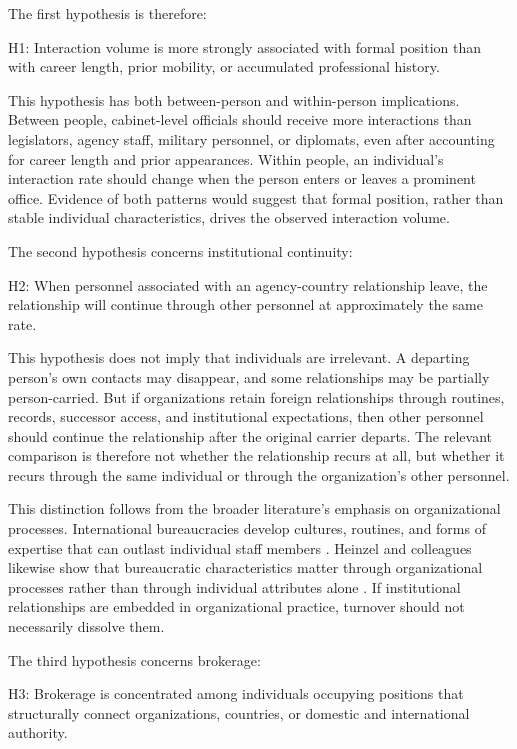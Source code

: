 \documentclass[11pt]{article}
\begin{document}
The first hypothesis is therefore:

H1: Interaction volume is more strongly associated with formal position than with career length, prior mobility, or accumulated professional history.

This hypothesis has both between-person and within-person implications. Between people, cabinet-level officials should receive more interactions than legislators, agency staff, military personnel, or diplomats, even after accounting for career length and prior appearances. Within people, an individual’s interaction rate should change when the person enters or leaves a prominent office. Evidence of both patterns would suggest that formal position, rather than stable individual characteristics, drives the observed interaction volume.

The second hypothesis concerns institutional continuity:

H2: When personnel associated with an agency-country relationship leave, the relationship will continue through other personnel at approximately the same rate.

This hypothesis does not imply that individuals are irrelevant. A departing person’s own contacts may disappear, and some relationships may be partially person-carried. But if organizations retain foreign relationships through routines, records, successor access, and institutional expectations, then other personnel should continue the relationship after the original carrier departs. The relevant comparison is therefore not whether the relationship recurs at all, but whether it recurs through the same individual or through the organization’s other personnel.

This distinction follows from the broader literature’s emphasis on organizational processes. International bureaucracies develop cultures, routines, and forms of expertise that can outlast individual staff members \citep{barnett2004rules,weaver2016,murdoch2019}. Heinzel and colleagues likewise show that bureaucratic characteristics matter through organizational processes rather than through individual attributes alone \citep{heinzel2022,heinzel2025bureaucratic}. If institutional relationships are embedded in organizational practice, turnover should not necessarily dissolve them.

The third hypothesis concerns brokerage:

H3: Brokerage is concentrated among individuals occupying positions that structurally connect organizations, countries, or domestic and international authority.
\end{document}
